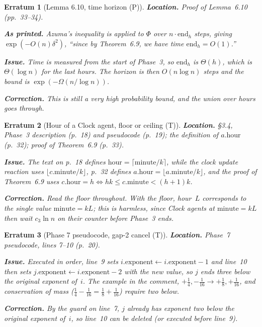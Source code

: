 \documentclass[11pt]{article}
\theoremstyle{erratumstyle}
\newtheorem{erratum}{Erratum}
\begin{document}
\begin{erratum}[Lemma 6.10, time horizon (P)]
\textbf{Location.} Proof of Lemma~6.10 (pp.~33--34).

\medskip
\textbf{As printed.} Azuma's inequality is applied to $\Phi$ over
$n\cdot\mathrm{end}_h$ steps, giving $\exp(-O(n)\delta^2)$, ``since by
Theorem~6.9, we have time $\mathrm{end}_h=O(1)$.''

\medskip
\textbf{Issue.} Time is measured from the start of Phase~3, so
$\mathrm{end}_h$ is $\Theta(h)$, which is $\Theta(\log n)$ for the last
hours. The horizon is then $O(n\log n)$ steps and the bound is
$\exp(-\Omega(n/\log n))$.

\medskip
\textbf{Correction.} This is still a very high probability bound, and the
union over hours goes through.
\end{erratum}

\begin{erratum}[Hour of a Clock agent, floor or ceiling (T)]
\textbf{Location.} \S3.4, Phase~3 description (p.~18) and pseudocode
(p.~19); the definition of $a.\mathrm{hour}$ (p.~32); proof of Theorem~6.9
(p.~33).

\medskip
\textbf{Issue.} The text on p.~18 defines
$\mathrm{hour}=\lceil\mathrm{minute}/k\rceil$, while the clock update reaction
uses $\lfloor c.\mathrm{minute}/k\rfloor$, p.~32 defines
$a.\mathrm{hour}=\lfloor a.\mathrm{minute}/k\rfloor$, and the proof of
Theorem~6.9 uses $c.\mathrm{hour}=h\iff hk\le c.\mathrm{minute}<(h+1)k$.

\medskip
\textbf{Correction.} Read the floor throughout. With the floor, hour~$L$
corresponds to the single value $\mathrm{minute}=kL$; this is harmless,
since Clock agents at $\mathrm{minute}=kL$ then wait $c_3\ln n$ on their
counter before Phase~3 ends.
\end{erratum}

\begin{erratum}[Phase 7 pseudocode, gap-2 cancel (T)]
\textbf{Location.} Phase~7 pseudocode, lines 7--10 (p.~20).

\medskip
\textbf{Issue.} Executed in order, line~9 sets
$i.\mathrm{exponent}\leftarrow i.\mathrm{exponent}-1$ and line~10 then sets
$j.\mathrm{exponent}\leftarrow i.\mathrm{exponent}-2$ with the new value, so
$j$ ends three below the original exponent of~$i$. The example in the
comment, $+\frac14,-\frac1{16}\to+\frac18,+\frac1{16}$, and conservation of
mass ($\frac14-\frac1{16}=\frac18+\frac1{16}$) require two below.

\medskip
\textbf{Correction.} By the guard on line~7, $j$ already has exponent two
below the original exponent of~$i$, so line~10 can be deleted (or executed
before line~9).
\end{erratum}
\end{document}
